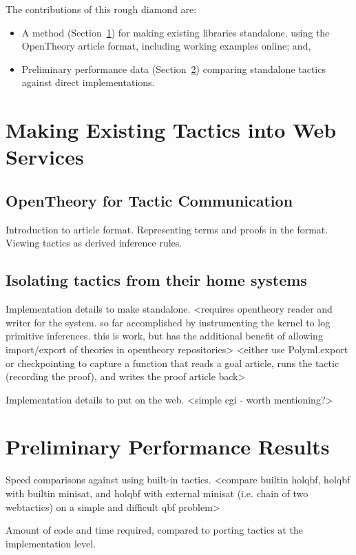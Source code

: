 \documentclass{llncs}
\newcommand{\OpenTheory}{OpenTheory\xspace}
\newcommand{\secref}[1]{Section~\ref{sec:#1}}
\begin{document}
The contributions of this rough diamond are:
\begin{itemize}
\item
A method (\secref{implementation}) for making existing libraries standalone, using the \OpenTheory article format, including working examples online; and,
\item
Preliminary performance data (\secref{performance}) comparing standalone tactics against direct implementations.
\end{itemize}

\section{Making Existing Tactics into Web Services}
\label{sec:implementation}

\subsection{\OpenTheory for Tactic Communication}
Introduction to article format.
Representing terms and proofs in the format.
Viewing tactics as derived inference rules.

\subsection{Isolating tactics from their home systems}
Implementation details to make standalone.
<requires opentheory reader and writer for the system. so far accomplished by instrumenting the kernel to log primitive inferences. this is work, but has the additional benefit of allowing import/export of theories in opentheory repositories>
<either use Polyml.export or checkpointing to capture a function that reads a goal article, runs the tactic (recording the proof), and writes the proof article back>

Implementation details to put on the web.
<simple cgi - worth mentioning?>

\section{Preliminary Performance Results}
\label{sec:performance}

Speed comparisons against using built-in tactics.
<compare builtin holqbf, holqbf with builtin minisat, and holqbf with external minisat (i.e. chain of two webtactics) on a simple and difficult qbf problem>

Amount of code and time required, compared to porting tactics at the implementation level.
\end{document}
